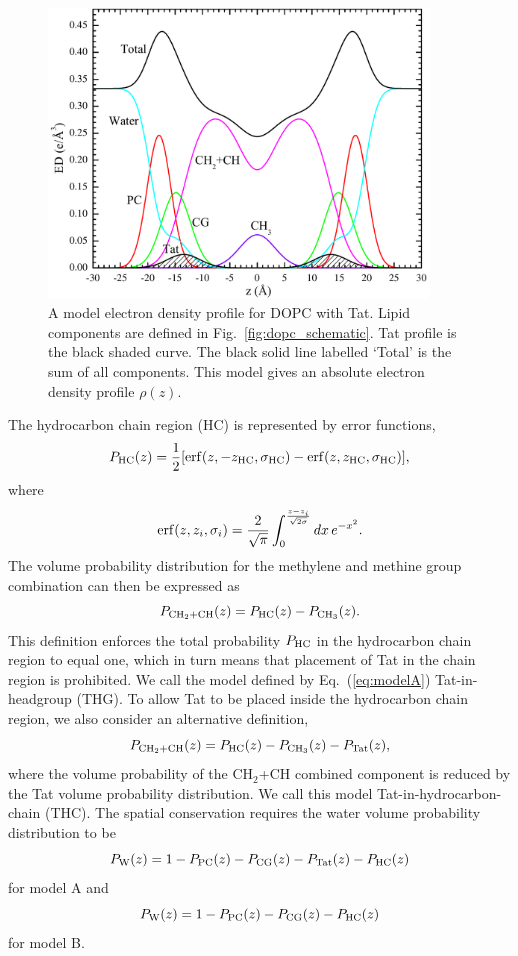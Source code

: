 \begin{figure}[htbp]
  \centering
  \includegraphics[width=0.9\textwidth]{figures/Tat/SDP_Results/EDP/DOPC_Tat_model_EDP}
  \caption{A model electron density profile for DOPC with Tat. Lipid components
  are defined in Fig.~\ref{fig:dopc_schematic}. Tat profile is the black shaded
  curve. The black solid line labelled `Total' is the sum of all components.
  This model gives an absolute electron density profile $\rho(z)$.
  }
  \label{fig:DOPC_EDP}
\end{figure}

The hydrocarbon chain region (HC) is represented by error functions,
\begin{equation}
  P_\textrm{HC}(z) = \frac{1}{2}\mathopen{}\left[ 
    \mathrm{erf}(z,-z_\textrm{HC},\sigma_\textrm{HC}) - \mathrm{erf}(z,z_\textrm{HC},\sigma_\textrm{HC})
   \right]\mathclose{},
\end{equation}
where
\begin{equation}
  \mathrm{erf}(z,z_i,\sigma_i)=\frac{2}{\sqrt{\pi}}
    \int_0^{\frac{z-z_i}{\sqrt{2\sigma}}} \mathop{dx} e^{-x^2}.
\end{equation}
The volume probability distribution for the methylene and methine group
combination can then be expressed as
\begin{equation}
  P_{\textrm{CH}_2+\textrm{CH}}(z) = P_\textrm{HC}(z)-P_{\textrm{CH}_3}(z).
  \label{eq:modelA}
\end{equation}
This definition enforces the total probability $P_\textrm{HC}$ in the hydrocarbon
chain region to equal one, which in turn means that placement of Tat in the  
chain region is prohibited. We call the model defined by Eq.~(\ref{eq:modelA})
Tat-in-headgroup (THG). To allow Tat to be placed inside the hydrocarbon
chain region, we also consider an alternative definition,
\begin{equation}
  P_{\textrm{CH}_2+\textrm{CH}}(z) = P_\textrm{HC}(z)-P_{\textrm{CH}_3}(z) - P_\textrm{Tat}(z),
\end{equation}
where the volume probability of the CH$_2$+CH combined component is reduced by 
the Tat volume probability distribution. We call this model Tat-in-hydrocarbon-chain (THC).
The spatial conservation requires the water volume probability distribution 
to be
\begin{equation}
  P_\textrm{W}(z) = 1-P_\textrm{PC}(z)-P_\textrm{CG}(z)-P_\textrm{Tat}(z)-P_\textrm{HC}(z)
\end{equation}
for model A and
\begin{equation}
  P_\textrm{W}(z) = 1-P_\textrm{PC}(z)-P_\textrm{CG}(z)-P_\textrm{HC}(z)
\end{equation}
for model B. 

